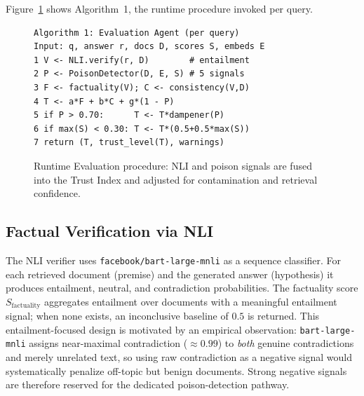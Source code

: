 Figure~\ref{fig:algo} shows Algorithm~1, the runtime procedure invoked per query.

\begin{figure}[!ht]
\footnotesize
\begin{verbatim}
Algorithm 1: Evaluation Agent (per query)
Input: q, answer r, docs D, scores S, embeds E
1 V <- NLI.verify(r, D)        # entailment
2 P <- PoisonDetector(D, E, S) # 5 signals
3 F <- factuality(V); C <- consistency(V,D)
4 T <- a*F + b*C + g*(1 - P)
5 if P > 0.70:      T <- T*dampener(P)
6 if max(S) < 0.30: T <- T*(0.5+0.5*max(S))
7 return (T, trust_level(T), warnings)
\end{verbatim}
\caption{Runtime Evaluation procedure: NLI and poison signals are fused into the Trust Index and adjusted for contamination and retrieval confidence.}
\label{fig:algo}
\end{figure}

\subsection{Factual Verification via NLI}
The NLI verifier uses \texttt{facebook/bart-large-mnli} as a sequence classifier. For each retrieved document (premise) and the generated answer (hypothesis) it produces entailment, neutral, and contradiction probabilities. The factuality score $S_{\text{factuality}}$ aggregates entailment over documents with a meaningful entailment signal; when none exists, an inconclusive baseline of $0.5$ is returned. This entailment-focused design is motivated by an empirical observation: \texttt{bart-large-mnli} assigns near-maximal contradiction ($\approx0.99$) to \emph{both} genuine contradictions and merely unrelated text, so using raw contradiction as a negative signal would systematically penalize off-topic but benign documents. Strong negative signals are therefore reserved for the dedicated poison-detection pathway.

